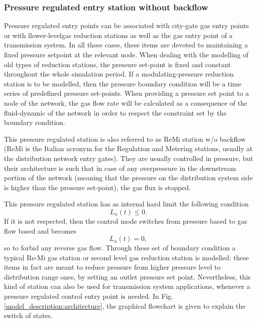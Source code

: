 \subsubsection{Pressure regulated entry station without backflow}
Pressure regulated entry points can be associated with city-gate gas entry points or with llower-levelgas reduction stations as well as the gas entry point of a transmission system. In all these cases, these items are devoted to maintaining a fixed pressure setpoint at the relevant node. When dealing with the modelling of old types of reduction stations, the pressure set-point is fixed and constant throughout the whole simulation period. If a modulating-pressure reduction station is to be modelled, then the pressure boundary condition will be a time series of predefined pressure set-points. 
When providing a pressure set point to a node of the network, the gas flow rate  will be calculated as a consequence of the fluid-dynamic of the network in order to respect the constraint set by the boundary condition. 

This pressure regulated station is also referred to as ReMi station w/o backflow (ReMi is the Italian acronym for the Regulation and Metering stations, usually at the distribution network entry gates).
They are usually controlled in pressure, but their architecture is such that in case of any overpressure in the downstream portion of the network (meaning that the pressure on the distribution system side is higher than the pressure set-point), the gas flux is stopped. 

This pressure regulated station has as internal hard limit the following condition
\begin{equation}
L_n(t) \le 0.
\end{equation}
If it is not respected, then the control mode switches from pressure based to gas flow based and becomes
\begin{equation}
L_n(t) = 0,
\end{equation}
so to forbid any reverse gas flow. 
Through these set of boundary condition a typical Re-Mi gas station or second level gas reduction station is modelled: these items in fact are meant to reduce pressure from higher pressure level to distribution range ones, by setting an outlet pressure set point. Nevertheless, this kind of station can also be used for transmission system applications, whenever a pressure regulated control entry point is needed.
In Fig. \ref{model_description:architecture}, the graphical flowchart is given to explain the switch of states.

